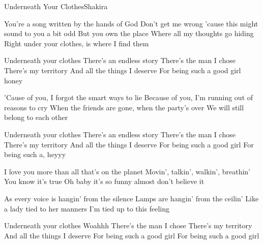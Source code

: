 \documentclass[a4paper,11pt,french]{article}
\begin{document}
\begin{Song}{Underneath Your Clothes}{Shakira}
\begin{multicols}{2}
\begin{Verse}
You're a song written by the hands of God
Don't get me wrong
'cause this might sound to you a bit odd
But you own the place 
Where all my thoughts go hiding
Right under your clothes, is where I find them
\end{Verse}
\espaceInterStrophe

\begin{Chorus}
Underneath your clothes
There's an endless story
There's the man I chose
There's my territory
And all the things I deserve
For being such a good girl honey
\end{Chorus}
\espaceInterStrophe

\begin{Verse}
'Cause of you, I forgot the smart ways to lie
Because of you, I'm running out of reasons to cry
When the friends are gone, when the party's over
We will still belong to each other
\end{Verse}
\espaceInterStrophe

\tochorus
\espaceInterStrophe

\begin{Chorus}
Underneath your clothes
There's an endless story
There's the man I chose
There's my territory
And all the things I deserve
For being such a good girl
For being such a, heyyy
\end{Chorus}
\espaceInterStrophe

\begin{Verse}
I love you more than all that's on the planet
Movin', talkin', walkin', breathin'
You know it's true
Oh baby it's so funny almost don't believe it
\espaceInterStrophe

As every voice is hangin' from the silence
Lamps are hangin' from the ceilin'
Like a lady tied to her manners
I'm tied up to this feeling
\end{Verse}
\espaceInterStrophe

\tochorus
\espaceInterStrophe

\begin{Chorus}
Underneath your clothes
Woahhh
There's the man I chose
There's my territory
And all the things I deserve
For being such a good girl
For being such a good girl
\end{Chorus}
\end{multicols}

\vfill


\end{Song}
\end{document}
